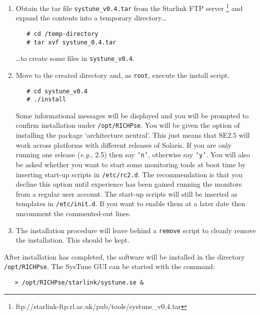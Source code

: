 \documentclass[11pt]{article}
\newcommand{\htmladdnormallinkfoot}[2]{#1\footnote{#2}}
\begin{document}
\begin{enumerate}

\item Obtain the tar file {\tt{systune\_v0.4.tar}} from the Starlink
FTP server \htmladdnormallinkfoot{}
{ftp://starlink-ftp.rl.ac.uk/pub/tools/systune\_v0.4.tar}
and expand the contents into a temporary directory\ldots

\begin{verbatim}
   # cd /temp-directory
   # tar xvf systune_0.4.tar
\end{verbatim}

\ldots to create some files in {\tt{systune\_v0.4}}.

\item Move to the created directory and, as {\tt{root}}, execute the install
script.

\begin{verbatim}
   # cd systune_v0.4
   # ./install
\end{verbatim}

Some informational messages will be displayed and you will be prompted
to confirm installation under {\tt{/opt/RICHPse}}. You will be given
the option of installing the package `architecture neutral'. This just
means that SE2.5 will work across platforms with different releases of
Solaris.  If you are only running one release ({\em{e.g.}}, 2.5) then
say {\tt{`n'}}, otherwise say {\tt{`y'}}. You will also be asked whether
you want to start some monitoring tools at boot time by inserting
start-up scripts in {\tt{/etc/rc2.d}}. The recommendation is that you
decline this option until experience has been gained running the
monitors from a regular user account. The start-up scripts will still
be inserted as templates in {\tt{/etc/init.d}}. If you want to enable
them at a later date then uncomment the commented-out lines.

\item The installation procedure will leave behind a {\tt{remove}} script
to cleanly remove the installation. This should be kept.

\end{enumerate}

After installation has completed, the software will be
installed in the directory {\tt{/opt/RICHPse}}. The SysTune GUI can be
started with the command:

\begin{verbatim}
   > /opt/RICHPse/starlink/systune.se &
\end{verbatim}
\end{document}
